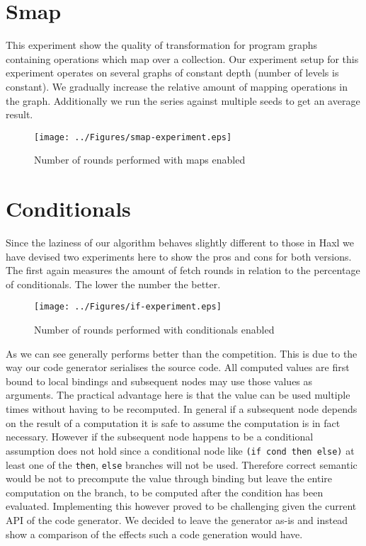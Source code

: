 \section{Smap}

This experiment show the quality of transformation for program graphs containing operations which map over a collection.
Our experiment setup for this experiment operates on several graphs of constant depth (number of levels is constant).
We gradually increase the relative amount of mapping operations in the graph.
Additionally we run the series against multiple seeds to get an average result.

\begin{figure}
    \texttt{[image: ../Figures/smap-experiment.eps]}
    \caption{Number of rounds performed with maps enabled}
\end{figure}

\section{Conditionals}



Since the laziness of our algorithm behaves slightly different to those in Haxl we have devised two experiments here to show the pros and cons for both versions.
The first again measures the amount of fetch rounds in relation to the percentage of conditionals.
The lower the number the better.

\begin{figure}
    \texttt{[image: ../Figures/if-experiment.eps]}
    \caption{Number of rounds performed with conditionals enabled}
\end{figure}

As we can see \yauhau{} generally performs better than the competition.
This is due to the way our code generator serialises the source code.
All computed values are first bound to local bindings and subsequent nodes may use those values as arguments.
The practical advantage here is that the value can be used multiple times without having to be recomputed.
In general if a subsequent node depends on the result of a computation it is safe to assume the computation is in fact necessary.
However if the subsequent node happens to be a conditional assumption does not hold since a conditional node like \texttt{(if cond then else)} at least one of the \texttt{then}, \texttt{else} branches will not be used.
Therefore correct semantic would be not to precompute the value through binding but leave the entire computation on the branch, to be computed after the condition has been evaluated.
Implementing this however proved to be challenging given the current API of the code generator.
We decided to leave the generator as-is and instead show a comparison of the effects such a code generation would have.

